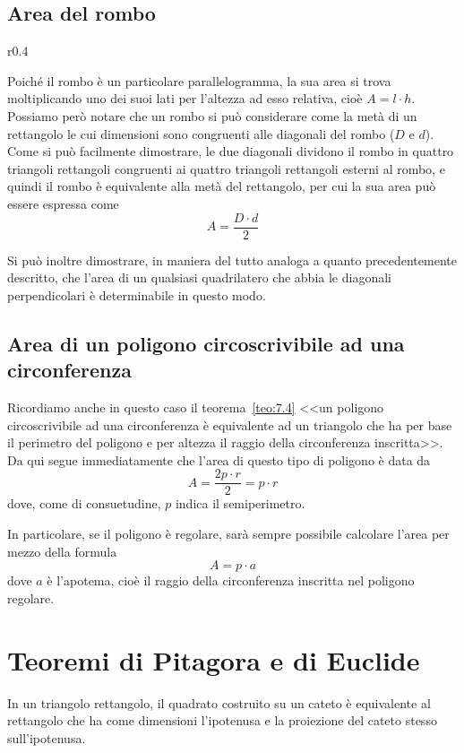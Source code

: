 \subsection{Area del rombo}

\begin{wrapfigure}{r}{0.4\textwidth}
	\centering
\end{wrapfigure}
Poiché il rombo è un particolare parallelogramma, la sua area si 
trova moltiplicando uno dei suoi lati per l'altezza ad esso relativa, 
cioè \(A=l\cdot h\).
Possiamo però notare che un rombo si può considerare come la metà di 
un rettangolo le cui dimensioni sono congruenti alle diagonali del 
rombo (\(D\) e \(d\)).
Come si può facilmente dimostrare, le due diagonali dividono il rombo 
in quattro triangoli rettangoli congruenti ai quattro triangoli 
rettangoli esterni al rombo, e quindi il rombo è equivalente alla 
metà del rettangolo, per cui la sua area può essere espressa come
\[\boxed{A=\dfrac{D\cdot d}{2}}\]

Si può inoltre dimostrare, in maniera del tutto analoga a quanto 
precedentemente descritto, che l'area di un qualsiasi quadrilatero 
che abbia le diagonali perpendicolari è determinabile in questo modo.

\subsection{Area di un poligono circoscrivibile ad una circonferenza}

Ricordiamo anche in questo caso il teorema~\ref{teo:7.4} <<un 
poligono circoscrivibile ad una circonferenza è equivalente ad un 
triangolo che ha per base il perimetro del poligono e per altezza il 
raggio della circonferenza inscritta>>.
Da qui segue immediatamente che l'area di questo tipo di poligono è 
data da
\[\boxed{A=\dfrac{2p\cdot r}{2}=p\cdot r}\]
dove, come di consuetudine, \(p\) indica il semiperimetro.

In particolare, se il poligono è regolare, sarà sempre possibile 
calcolare l'area per mezzo della formula
\[\boxed{A=p\cdot a}\]
dove \(a\) è l'apotema, cioè il raggio della circonferenza inscritta 
nel poligono regolare.

\section{Teoremi di Pitagora e di 
Euclide}\label{sect:teoremi_pitagora_euclide}

\begin{teorema}
In un triangolo rettangolo, il quadrato costruito su un cateto è 
equivalente al rettangolo che ha come dimensioni l'ipotenusa e la 
proiezione del cateto stesso sull'ipotenusa.
\end{teorema}


